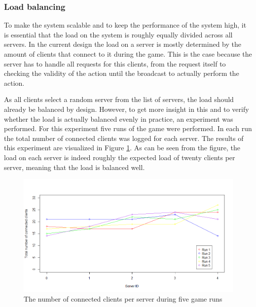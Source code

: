 \subsubsection{Load balancing}
\label{subsubsec:exp_load}
To make the system scalable and to keep the performance of the system high, it is essential that the load on the system is roughly equally divided across all servers.
In the current design the load on a server is mostly determined by the amount of clients that connect to it during the game. 
This is the case because the server has to handle all requests for this clients, from the request itself to checking the validity of the action until the broadcast to actually perform the action.

As all clients select a random server from the list of servers, the load should already be balanced by design.
However, to get more insight in this and to verify whether the load is actually balanced evenly in practice, an experiment was performed. 
For this experiment five runs of the game were performed. In each run the total number of connected clients was logged for each server. 
The results of this experiment are visualized in Figure \ref{fig:connected_players_plot}. 
As can be seen from the figure, the load on each server is indeed roughly the expected load of twenty clients per server, meaning that the load is balanced well.

\begin{figure}[h!]
  \centering
    \includegraphics[width=\textwidth]{images/connected_players_plot}
    
  \caption{The number of connected clients per server during five game runs}
  \label{fig:connected_players_plot}
\end{figure}